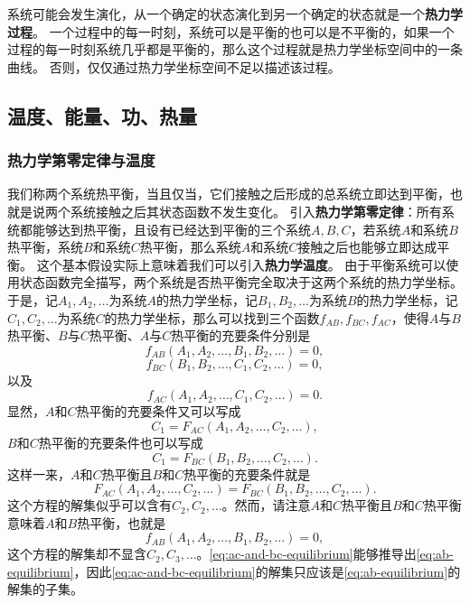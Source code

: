 \documentclass[hyperref, UTF8, a4paper]{ctexart}
\begin{document}
系统可能会发生演化，从一个确定的状态演化到另一个确定的状态就是一个\textbf{热力学过程}。
一个过程中的每一时刻，系统可以是平衡的也可以是不平衡的，如果一个过程的每一时刻系统几乎都是平衡的，那么这个过程就是热力学坐标空间中的一条曲线。
否则，仅仅通过热力学坐标空间不足以描述该过程。

\subsection{温度、能量、功、热量}

\subsubsection{热力学第零定律与温度}

我们称两个系统热平衡，当且仅当，它们接触之后形成的总系统立即达到平衡，也就是说两个系统接触之后其状态函数不发生变化。
引入\textbf{热力学第零定律}：所有系统都能够达到热平衡，且设有已经达到平衡的三个系统$A,B,C$，若系统$A$和系统$B$热平衡，系统$B$和系统$C$热平衡，那么系统$A$和系统$C$接触之后也能够立即达成平衡。
这个基本假设实际上意味着我们可以引入\textbf{热力学温度}。
由于平衡系统可以使用状态函数完全描写，两个系统是否热平衡完全取决于这两个系统的热力学坐标。
于是，记$A_1, A_2, \ldots$为系统$A$的热力学坐标，记$B_1, B_2, \ldots$为系统$B$的热力学坐标，记$C_1, C_2, \ldots$为系统$C$的热力学坐标，那么可以找到三个函数$f_{AB}, f_{BC}, f_{AC}$，使得$A$与$B$热平衡、$B$与$C$热平衡、$A$与$C$热平衡的充要条件分别是
\[
    f_{AB} (A_1, A_2, \ldots, B_1, B_2, \ldots) = 0,
\]
\[
    f_{BC} (B_1, B_2, \ldots, C_1, C_2, \ldots) = 0,
\]
以及
\[
    f_{AC} (A_1, A_2, \ldots, C_1, C_2, \ldots) = 0. 
\]
显然，$A$和$C$热平衡的充要条件又可以写成
\[
    C_1 = F_{AC} (A_1, A_2, \ldots, C_2, \ldots),
\]
$B$和$C$热平衡的充要条件也可以写成
\[
    C_1 = F_{BC} (B_1, B_2, \ldots, C_2, \ldots).
\]
这样一来，$A$和$C$热平衡且$B$和$C$热平衡的充要条件就是
\begin{equation}
    F_{AC} (A_1, A_2, \ldots, C_2, \ldots) = F_{BC} (B_1, B_2, \ldots, C_2, \ldots).
    \label{eq:ac-and-bc-equilibrium}
\end{equation}
这个方程的解集似乎可以含有$C_2, C_2, \ldots$。然而，请注意$A$和$C$热平衡且$B$和$C$热平衡意味着$A$和$B$热平衡，也就是
\begin{equation}
    f_{AB} (A_1, A_2, \ldots, B_1, B_2, \ldots) = 0,
    \label{eq:ab-equilibrium}
\end{equation}
这个方程的解集却不显含$C_2, C_3, \ldots$。\eqref{eq:ac-and-bc-equilibrium}能够推导出\eqref{eq:ab-equilibrium}，因此\eqref{eq:ac-and-bc-equilibrium}的解集只应该是\eqref{eq:ab-equilibrium}的解集的子集。
\end{document}
